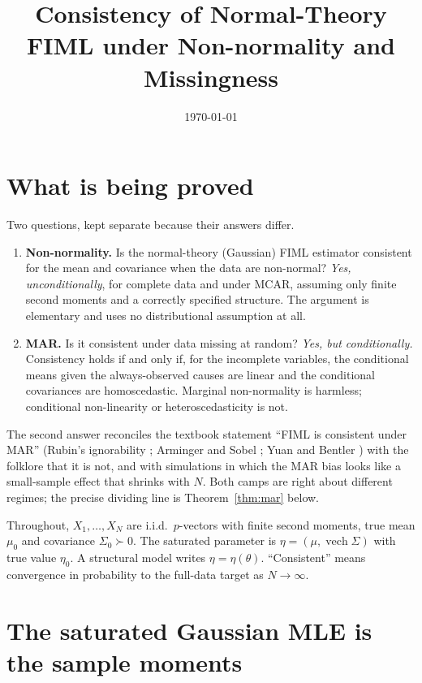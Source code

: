 \documentclass[11pt]{article}
\title{Consistency of Normal-Theory FIML under Non-normality and
Missingness}
\author{}
\date{\today}
\newcommand{\vech}{\operatorname{vech}}
\theoremstyle{plain}
\theoremstyle{remark}
\begin{document}
\maketitle

\section*{What is being proved}

Two questions, kept separate because their answers differ.

\begin{enumerate}
  \item \textbf{Non-normality.} Is the normal-theory (Gaussian) FIML estimator
        consistent for the mean and covariance when the data are non-normal?
        \emph{Yes, unconditionally}, for complete data and under MCAR, assuming
        only finite second moments and a correctly specified structure. The
        argument is elementary and uses no distributional assumption at all.
  \item \textbf{MAR.} Is it consistent under data missing at random?
        \emph{Yes, but conditionally.} Consistency holds if and only if, for the
        incomplete variables, the conditional means given the always-observed
        causes are linear and the conditional covariances are homoscedastic.
        Marginal non-normality is harmless; conditional non-linearity or
        heteroscedasticity is not.
\end{enumerate}

The second answer reconciles the textbook statement ``FIML is consistent under
MAR'' (Rubin's ignorability \cite{rubin1976}; Arminger and Sobel
\cite{armingersobel1990}; Yuan and Bentler \cite{yuanbentler2000}) with the
folklore that it is not, and with simulations in which the MAR bias looks like a
small-sample effect that shrinks with $N$. Both camps are right about different
regimes; the precise dividing line is Theorem~\ref{thm:mar} below.

Throughout, $X_1,\ldots,X_N$ are i.i.d.\ $p$-vectors with finite second moments,
true mean $\mu_0$ and covariance $\Sigma_0\succ0$. The saturated parameter is
$\eta=(\mu,\vech\Sigma)$ with true value $\eta_0$. A structural model writes
$\eta=\eta(\theta)$. ``Consistent'' means convergence in probability to the
full-data target as $N\to\infty$.

\section{The saturated Gaussian MLE is the sample moments}
\end{document}
